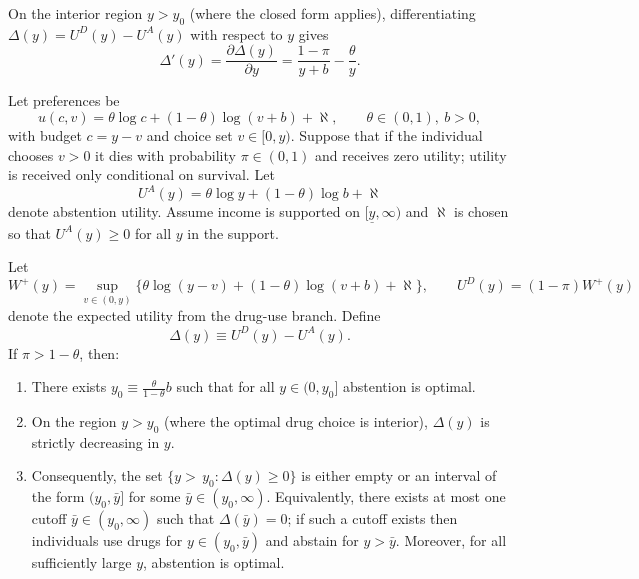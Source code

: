 On the interior region $y>y_0$ (where the closed form applies), differentiating $\Delta(y)=U^{D}(y)-U^{A}(y)$ with respect to $y$ gives
\[
\Delta'(y)=\frac{\partial\Delta(y)}{\partial y}=\frac{1-\pi}{y+b}-\frac{\theta}{y}.
\]

\begin{lemma}\label{lem:income_sorting_mortality}
Let preferences be
\[
u(c,v)=\theta\log c+(1-\theta)\log(v+b)+\aleph,\qquad \theta\in(0,1),\ b>0,
\]
with budget $c=y-v$ and choice set $v\in[0,y)$. Suppose that if the individual chooses $v>0$ it dies with probability
$\pi\in(0,1)$ and receives zero utility; utility is received only conditional on survival. Let
\[
U^A(y)=\theta\log y+(1-\theta)\log b+\aleph
\]
denote abstention utility. Assume income is supported on $[\underline y,\infty)$ and $\aleph$ is chosen so that $U^A(y)\ge 0$ for all $y$ in the support.

Let
\[
W^{+}(y)=\sup_{v\in(0,y)}\{\theta\log(y-v)+(1-\theta)\log(v+b)+\aleph\},
\qquad
U^D(y)=(1-\pi)W^{+}(y)
\]
denote the expected utility from the drug-use branch. Define
\[
\Delta(y)\equiv U^D(y)-U^A(y).
\]
If $\pi>1-\theta$, then:
\begin{enumerate}
\item There exists $y_0\equiv \frac{\theta}{1-\theta}b$ such that for all $y\in(0,y_0]$ abstention is optimal.
\item On the region $y>y_0$ (where the optimal drug choice is interior), $\Delta(y)$ is strictly decreasing in $y$.
\item Consequently, the set $\{y>\,y_0:\Delta(y)\ge 0\}$ is either empty or an interval of the form $(y_0,\bar y]$ for some $\bar y\in(y_0,\infty)$. Equivalently, there exists at most one cutoff $\bar y\in(y_0,\infty)$ such that $\Delta(\bar y)=0$; if such a cutoff exists then individuals use drugs for $y\in(y_0,\bar y)$ and abstain for $y>\bar y$. Moreover, for all sufficiently large $y$, abstention is optimal.
\end{enumerate}
\end{lemma}

